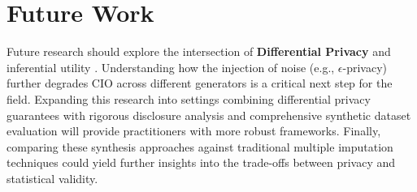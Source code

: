 \section{Future Work}
\label{sec:reg-future-work}
Future research should explore the intersection of \textbf{Differential Privacy} and inferential utility \cite{dwork2006, jordon2018}. Understanding how the injection of noise (e.g., $\epsilon$-privacy) further degrades CIO across different generators is a critical next step for the field. Expanding this research into settings combining differential privacy guarantees with rigorous disclosure analysis \cite{abowd2003} and comprehensive synthetic dataset evaluation \cite{bellovin2019, bowen2020, hsu2021} will provide practitioners with more robust frameworks. Finally, comparing these synthesis approaches against traditional multiple imputation techniques \cite{rubin1987, raghunathan2003} could yield further insights into the trade-offs between privacy and statistical validity.
